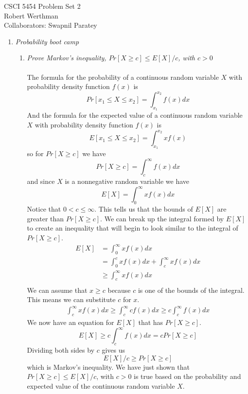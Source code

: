 \documentclass[12pt]{article}
\begin{document}
CSCI 5454 \hfill Problem Set 2\\
Robert Werthman\\
Collaborators: Swapnil Paratey 

\hrulefill

\begin{enumerate}

	\item \textit{Probability boot camp}
	
	\begin{enumerate}
	
		\item \textit{Prove Markov's inequality, $Pr[X \ge c] \le E[X]/c$, with $c>0$}\\
		\\
		The formula for the probability of a continuous random variable $X$ with probability density function $f(x)$ is
			$$
			Pr[x_1 \le X \le x_2] = \int_{x_1}^{x_2} f(x)dx
			$$	
		And the formula for the expected value of a continuous random variable $X$ with probability density function $f(x)$ is
			$$
			E[x_1 \le X \le x_2] = \int_{x_1}^{x_2} xf(x)
			$$	
		so for $Pr[X \ge c]$ we have
			$$
			Pr[X \ge c] = \int_{c}^{\infty} f(x)dx
			$$
		and since $X$ is a nonnegative random variable we have
			$$
			E[X] = \int_{0}^{\infty} xf(x)dx
			$$
		Notice that $0 < c \le \infty$.  This tells us that the bounds of $E[X]$ are greater than $Pr[X \ge c]$.  We can break up the integral formed by $E[X]$ to create an inequality that 
		will begin to look similar to the integral of $Pr[X \ge c]$.
			\begin{align*}
				E[X] &= \int_{0}^{\infty} xf(x)dx\\
				&= \int_{0}^{c} xf(x)dx + \int_{c}^{\infty} xf(x)dx\\
				&\ge \int_{c}^{\infty} xf(x)dx\\
			\end{align*}
		We can assume that $x \ge c$ because $c$ is one of the bounds of the integral.  This means we can substitute $c$ for $x$.
			\begin{align*}
				 \int_{c}^{\infty} xf(x)dx \ge \int_{c}^{\infty} cf(x)dx \ge c\int_{c}^{\infty} f(x)dx
			\end{align*}
		We now have an equation for $E[X]$ that has $Pr[X \ge c]$.
			$$
			E[X] \ge c\int_{c}^{\infty} f(x)dx = cPr[X \ge c]
			$$
		Dividing both sides by $c$ gives us
			$$
			E[X]/c \ge Pr[X \ge c]
			$$
		which is Markov's inequality.  We have just shown that $Pr[X \ge c] \le E[X]/c$, with $c>0$ is true based on the probability and expected value of the continuous random variable $X$.
		

\end{enumerate}
\end{enumerate}
\end{document}
